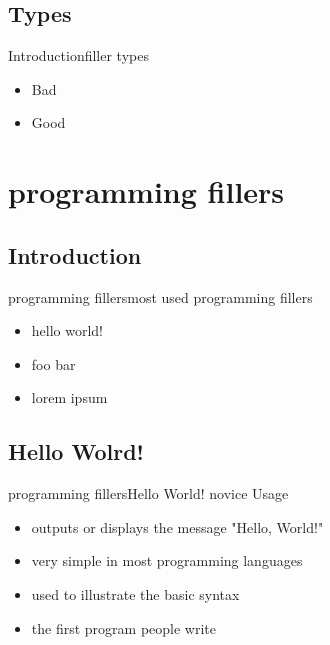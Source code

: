 \documentclass[10pt]{beamer}
\begin{document}
\subsection{Types}
\begin{frame}{Introduction}{filler types} 

	\begin{itemize}
		\item<1- > Bad
		\item<2- > Good
	\end{itemize}

\end{frame}

\section{programming fillers}
\subsection{Introduction}
\begin{frame}{programming fillers}{most used programming fillers} 

	\begin{itemize}
		\item<1- > hello world!
		\item<2- > foo bar
		\item<3- > lorem ipsum
	\end{itemize}

\end{frame}

\subsection{Hello Wolrd!}
\begin{frame}{programming fillers}{Hello World!} 
	novice Usage
	\begin{itemize}
		\item outputs or displays the message "Hello, World!"
		\item very simple in most programming languages
		\item used to illustrate the basic syntax
		\item the first program people write
	\end{itemize}

\end{frame}
\end{document}
